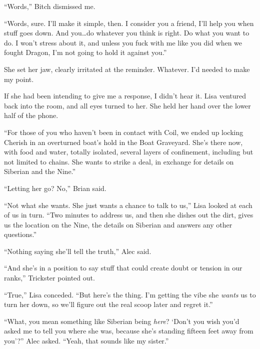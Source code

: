 ``Words,'' Bitch dismissed me.



``Words, sure.  I'll make it simple, then.  I consider you a friend, I'll help you when stuff goes down.  And you\ldots do whatever you think is right.  Do what you want to do.  I won't stress about it, and unless you fuck with me like you did when we fought Dragon, I'm not going to hold it against you.''



She set her jaw, clearly irritated at the reminder.  Whatever.  I'd needed to make my point.



If she had been intending to give me a response, I didn't hear it.  Lisa ventured back into the room, and all eyes turned to her.  She held her hand over the lower half of the phone.



``For those of you who haven't been in contact with Coil, we ended up locking Cherish in an overturned boat's hold in the Boat Graveyard.  She's there now, with food and water, totally isolated, several layers of confinement, including but not limited to chains.  She wants to strike a deal, in exchange for details on Siberian and the Nine.''



``Letting her go?  No,'' Brian said.



``Not what she wants.  She just wants a chance to talk to us,'' Lisa looked at each of us in turn.  ``Two minutes to address us, and then she dishes out the dirt, gives us the location on the Nine, the details on Siberian and answers any other questions.''



``Nothing saying she'll tell the truth,'' Alec said.



``And she's in a position to say stuff that could create doubt or tension in our ranks,'' Trickster pointed out.



``True,'' Lisa conceded.  ``But here's the thing.  I'm getting the vibe she \emph{wants} us to turn her down, so we'll figure out the real scoop later and regret it.''



``What, you mean something like Siberian being \emph{here}?  `Don't you wish you'd asked me to tell you where she was, because she's standing fifteen feet away from you'?'' Alec asked.  ``Yeah, that sounds like my sister.''



